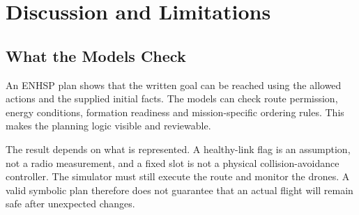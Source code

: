 \documentclass[11pt,a4paper,oneside]{report}
\begin{document}
\chapter{Discussion and Limitations}\label{ch:discussion}

\section{What the Models Check}
An ENHSP plan shows that the written goal can be reached using the allowed
actions and the supplied initial facts. The models can check route permission,
energy conditions, formation readiness and mission-specific ordering rules.
This makes the planning logic visible and reviewable.

The result depends on what is represented. A healthy-link flag is an assumption,
not a radio measurement, and a fixed slot is not a physical collision-avoidance
controller. The simulator must still execute the route and monitor the drones.
A valid symbolic plan therefore does not guarantee that an actual flight will
remain safe after unexpected changes.
\end{document}
